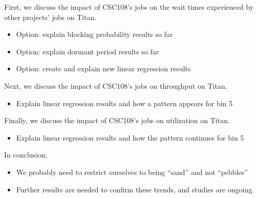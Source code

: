 First, we discuss the impact of CSC108's jobs on the wait times experienced by
other projects' jobs on Titan.
\begin{itemize}
    \item Option: explain blocking probability results so far
    \item Option: explain dormant period results so far
    \item Option: create and explain new linear regression results
\end{itemize}

Next, we discuss the impact of CSC108's jobs on throughput on Titan.
\begin{itemize}
    \item Explain linear regression results and how a pattern appears for bin 5
\end{itemize}

Finally, we discuss the impact of CSC108's jobs on utilization on Titan.
\begin{itemize}
    \item Explain linear regression results and how the pattern continues for
        bin 5
\end{itemize}

In conclusion,
\begin{itemize}
    \item We probably need to restrict ourselves to being ``sand'' and not
        ``pebbles''
    \item Further results are needed to confirm these trends, and studies are
        ongoing.
\end{itemize}


